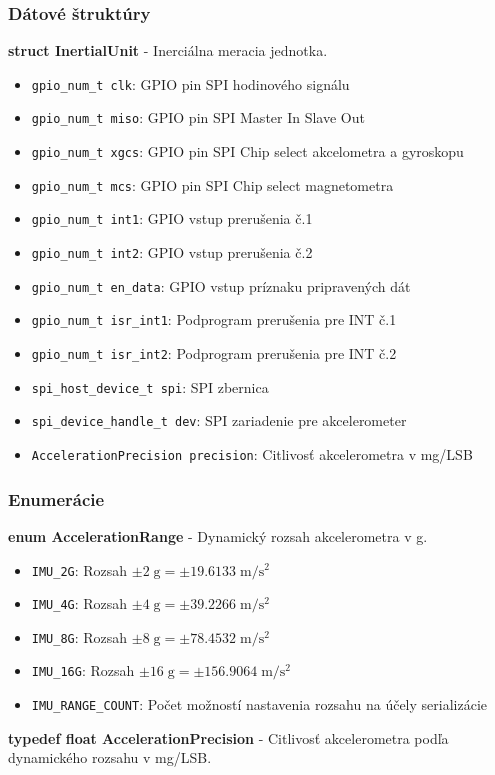 \subsubsection*{Dátové štruktúry}
\textbf{struct InertialUnit} - Inerciálna meracia jednotka.
\begin{itemize}[noitemsep, topsep=0pt]
	\item \verb|gpio_num_t clk|: GPIO pin SPI hodinového signálu
	\item \verb|gpio_num_t miso|: GPIO pin SPI Master In Slave Out
	\item \verb|gpio_num_t xgcs|: GPIO pin SPI Chip select akcelometra a gyroskopu
	\item \verb|gpio_num_t mcs|: GPIO pin SPI Chip select magnetometra
	\item \verb|gpio_num_t int1|: GPIO vstup prerušenia č.1
	\item \verb|gpio_num_t int2|: GPIO vstup prerušenia č.2
	\item \verb|gpio_num_t en_data|: GPIO vstup príznaku pripravených dát
	\item \verb|gpio_num_t isr_int1|: Podprogram prerušenia pre INT č.1
	\item \verb|gpio_num_t isr_int2|: Podprogram prerušenia pre INT č.2
	\item \verb|spi_host_device_t spi|: SPI zbernica
	\item \verb|spi_device_handle_t dev|: SPI zariadenie pre akcelerometer
	\item \verb|AccelerationPrecision precision|: Citlivosť akcelerometra v mg/LSB
\end{itemize}

\subsubsection*{Enumerácie}
\textbf{enum AccelerationRange} - Dynamický rozsah akcelerometra v g.
	\begin{itemize}[noitemsep, topsep=0pt]
		\item \verb|IMU_2G|: Rozsah $\pm 2\;\mathrm{g}  = \pm 19.6133 \;\mathrm{m/s^2}$
		\item \verb|IMU_4G|: Rozsah $ \pm 4\;\mathrm{g} = \pm 39.2266 \;\mathrm{m/s^2}$
		\item \verb|IMU_8G|: Rozsah $ \pm 8\;\mathrm{g}  = \pm 78.4532 \;\mathrm{m/s^2}$
		\item \verb|IMU_16G|: Rozsah $ \pm 16\;\mathrm{g}  = \pm 156.9064 \;\mathrm{m/s^2}$
		\item \verb|IMU_RANGE_COUNT|: Počet možností nastavenia rozsahu na účely serializácie
	\end{itemize}
\bigbreak
\noindent\textbf{typedef float AccelerationPrecision} - Citlivosť akcelerometra podľa dynamického rozsahu v mg/LSB.

